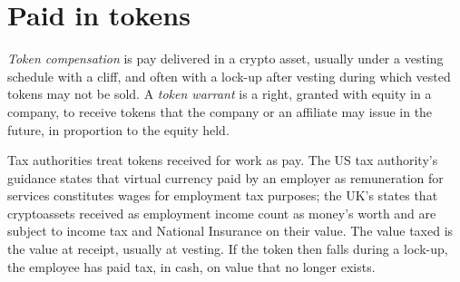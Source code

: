 \begin{omfigure}

\label{fig:in:crypto-native-firms:perhead}
\end{omfigure}

\section{Paid in tokens}

\begin{definition}\label{def:in:crypto-native-firms:tokens}
\emph{Token compensation} is pay delivered in a crypto asset, usually under a vesting schedule
with a cliff, and often with a lock-up after vesting during which vested tokens may not be sold. A \emph{token
warrant} is a right, granted with equity in a company, to receive tokens that the company or an
affiliate may issue in the future, in proportion to the equity held.
\end{definition}

Tax authorities treat tokens received for work as pay. The US tax authority's guidance states that virtual currency paid
by an employer as remuneration for services constitutes wages for employment tax purposes; the UK's states that
cryptoassets received as employment income count as money's worth and are subject to income tax and National Insurance on
their value. The value taxed is the value at receipt, usually at vesting. If the token then falls during a lock-up, the
employee has paid tax, in cash, on value that no longer exists.

